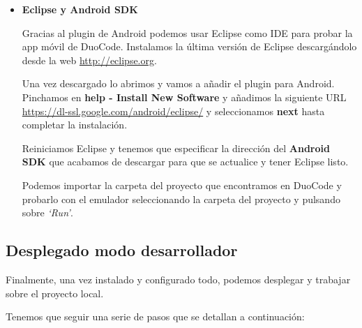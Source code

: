 \begin{itemize}
\item \textbf{Eclipse y Android SDK}

Gracias al plugin de Android podemos usar Eclipse como IDE para probar la app móvil de DuoCode. Instalamos la última versión de Eclipse descargándolo desde la web \url{http://eclipse.org}.

Una vez descargado lo abrimos y vamos a añadir el plugin para Android.
Pinchamos en \textbf{help - Install New Software} y añadimos la siguiente URL \url{https://dl-ssl.google.com/android/eclipse/} y seleccionamos \textbf{next} hasta completar la instalación.

Reiniciamos Eclipse y tenemos que especificar la dirección del \textbf{Android SDK} que acabamos de descargar para que se actualice y tener Eclipse listo.

Podemos importar la carpeta del proyecto que encontramos en DuoCode y probarlo con el emulador seleccionando la carpeta del proyecto y pulsando sobre \textit{`Run'}.

\end{itemize}

\subsection{Desplegado modo desarrollador}

Finalmente, una vez instalado y configurado todo, podemos desplegar y trabajar sobre el proyecto local.

Tenemos que seguir una serie de pasos que se detallan a continuación:


